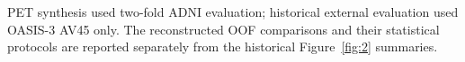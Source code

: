 PET synthesis used two-fold ADNI evaluation; historical external evaluation used OASIS-3 AV45 only. The reconstructed OOF comparisons and their statistical protocols are reported separately from the historical Figure~\ref{fig:2} summaries.

